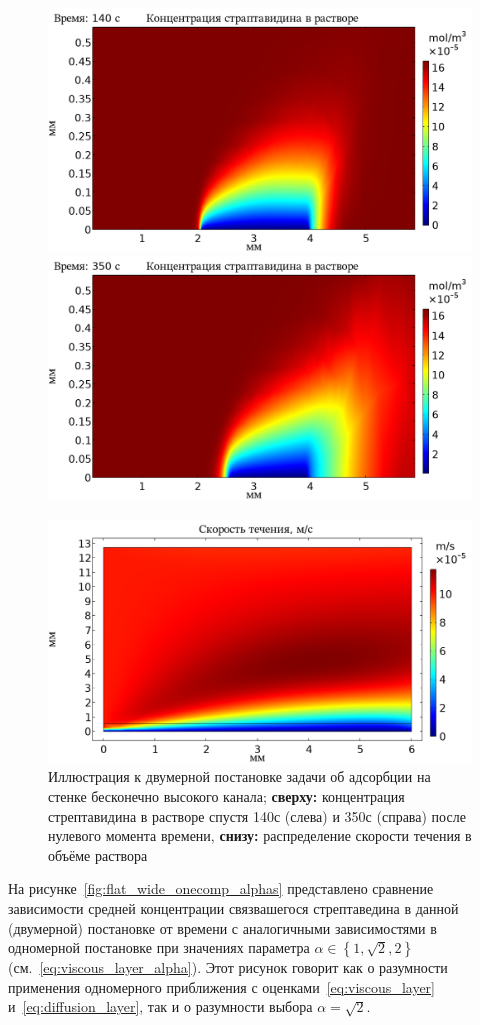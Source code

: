 \documentclass[oneside,final,12pt]{extreport}
\begin{document}
\begin{figure}
  \centering
  \includegraphics[width=.5\textwidth]{pic/flat_wide_onecomp_plate_concentration_140s}%
  \includegraphics[width=.5\textwidth]{pic/flat_wide_onecomp_plate_concentration_350s}

  \includegraphics[width=.6\textwidth]{pic/flat_wide_onecomp_plate_velocity}

  \caption{\label{fig:flat_wide_plate_illustration}%
    Иллюстрация к двумерной постановке задачи об адсорбции
    на стенке бесконечно высокого канала;
    \textbf{сверху:} концентрация стрептавидина в растворе
    спустя 140с (слева) и 350с (справа) после нулевого момента времени,
    \textbf{снизу:} распределение скорости течения в объёме раствора
  }
\end{figure}

На рисунке~\ref{fig:flat_wide_onecomp_alphas}
представлено сравнение зависимости средней концентрации
связвашегося стрептаведина в данной (двумерной) постановке
от времени с аналогичными зависимостями в одномерной постановке
при значениях параметра
$\alpha \in \left\{ 1, \sqrt{2}, 2 \right\}$
(см.~\eqref{eq:viscous_layer_alpha}).
Этот рисунок говорит как о разумности применения одномерного приближения
с оценками~\eqref{eq:viscous_layer} и~\eqref{eq:diffusion_layer},
так и о разумности выбора $\alpha = \sqrt{2}$.
\end{document}
